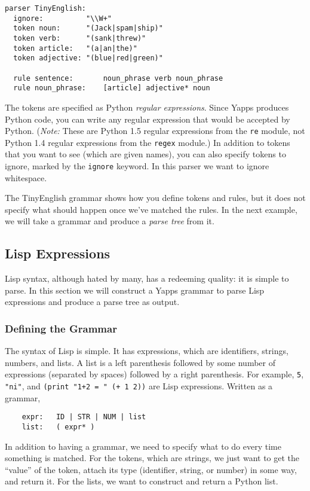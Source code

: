 \documentclass[10pt]{article}
\newcommand{\mysubsection}[1]{\subsection{#1}}
\begin{document}
\begin{verbatim}
parser TinyEnglish:
  ignore:          "\\W+"
  token noun:      "(Jack|spam|ship)"
  token verb:      "(sank|threw)"
  token article:   "(a|an|the)"
  token adjective: "(blue|red|green)"

  rule sentence:       noun_phrase verb noun_phrase
  rule noun_phrase:    [article] adjective* noun
\end{verbatim}

The tokens are specified as Python \emph{regular expressions}.  Since
Yapps produces Python code, you can write any regular expression that
would be accepted by Python.  (\emph{Note:} These are Python 1.5
regular expressions from the \texttt{re} module, not Python 1.4
regular expressions from the \texttt{regex} module.)  In addition to
tokens that you want to see (which are given names), you can also
specify tokens to ignore, marked by the \texttt{ignore} keyword.  In
this parser we want to ignore whitespace.

The TinyEnglish grammar shows how you define tokens and rules, but it
does not specify what should happen once we've matched the rules.  In
the next example, we will take a grammar and produce a \emph{parse
tree} from it.

\mysubsection{Lisp Expressions}

Lisp syntax, although hated by many, has a redeeming quality: it is
simple to parse.  In this section we will construct a Yapps grammar to
parse Lisp expressions and produce a parse tree as output.

\subsubsection*{Defining the Grammar}

The syntax of Lisp is simple.  It has expressions, which are
identifiers, strings, numbers, and lists.  A list is a left
parenthesis followed by some number of expressions (separated by
spaces) followed by a right parenthesis.  For example, \verb|5|,
\verb|"ni"|, and \verb|(print "1+2 = " (+ 1 2))| are Lisp expressions.
Written as a grammar,

\begin{verbatim}
    expr:   ID | STR | NUM | list
    list:   ( expr* )  
\end{verbatim}

In addition to having a grammar, we need to specify what to do every
time something is matched.  For the tokens, which are strings, we just
want to get the ``value'' of the token, attach its type (identifier,
string, or number) in some way, and return it.  For the lists, we want
to construct and return a Python list.
\end{document}
